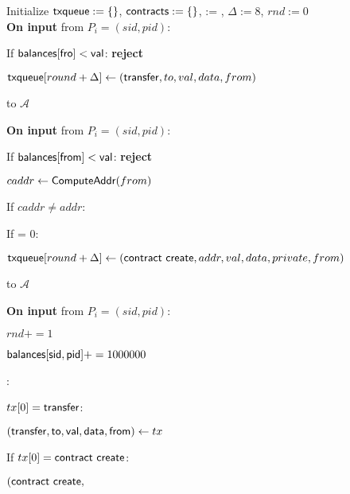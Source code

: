 \begin{bbox}[title=$\globalf{G}_{\msf{ledger}}$]

Initialize ${\mathsf {txqueue}} := \{\}$, ${\mathsf {contracts}} := \{\}$,  := \edict, $\Delta := 8$, $rnd := 0$\\

{\bf On input} \transfermsg from $P_i=(sid,pid)$:

	\quad If ${\mathsf {balances[fro]}} < {\mathsf {val}}$: {\bf reject}
	
	\quad $\msf{txqueue}[round + \Delta] \lar \transfermsg$
	
	 \transfermsg to $\mathcal{A}$

{\bf On input} \createmsg from $P_i=(sid,pid)$:

	\quad If ${\mathsf {balances[from]}} < {\mathsf {val}}$: {\bf reject}
	
	\quad $caddr \leftarrow {\mathsf {ComputeAddr}}(from)$
	
	\quad If $caddr \neq addr$: \reject

	\quad If  = 0: \reject

	\quad $\msf{txqueue}[round + \Delta] \lar \createmsg$

	 \createmsg to $\mathcal{A}$

{\bf On input}  from $P_i=(sid,pid)$:

	\quad $rnd += 1$

	\quad ${\mathsf {balances[sid,pid]}} += 1000000$

	\quad \For {} \In {}: 

		\qquad \If $tx[0] = {\mathsf {transfer}}$:
			
			\qqquad $({\mathsf {transfer, to, val, data, from}}) \leftarrow tx$

			\qqquad {}

		\qquad If $tx[0] = \msf{contract \ create}$:

			\qqquad $({\mathsf {contract \ create}}, $
\end{bbox}
